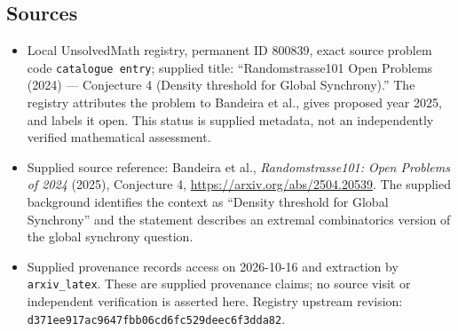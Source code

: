 \documentclass[11pt]{article}
\begin{document}
\subsection{Sources}
\begin{itemize}
\item Local UnsolvedMath registry, permanent ID \(800839\), exact source problem code \texttt{catalogue entry}; supplied title: ``Randomstrasse101 Open Problems (2024) --- Conjecture 4 (Density threshold for Global Synchrony).'' The registry attributes the problem to Bandeira et al., gives proposed year 2025, and labels it open. This status is supplied metadata, not an independently verified mathematical assessment.
\item Supplied source reference: Bandeira et al., \emph{Randomstrasse101: Open Problems of 2024} (2025), Conjecture 4, \url{https://arxiv.org/abs/2504.20539}. The supplied background identifies the context as ``Density threshold for Global Synchrony'' and the statement describes an extremal combinatorics version of the global synchrony question.
\item Supplied provenance records access on 2026-10-16 and extraction by \texttt{arxiv\_latex}. These are supplied provenance claims; no source visit or independent verification is asserted here. Registry upstream revision: \texttt{d371ee917ac9647fbb06cd6fc529deec6f3dda82}.
\end{itemize}
\end{document}
